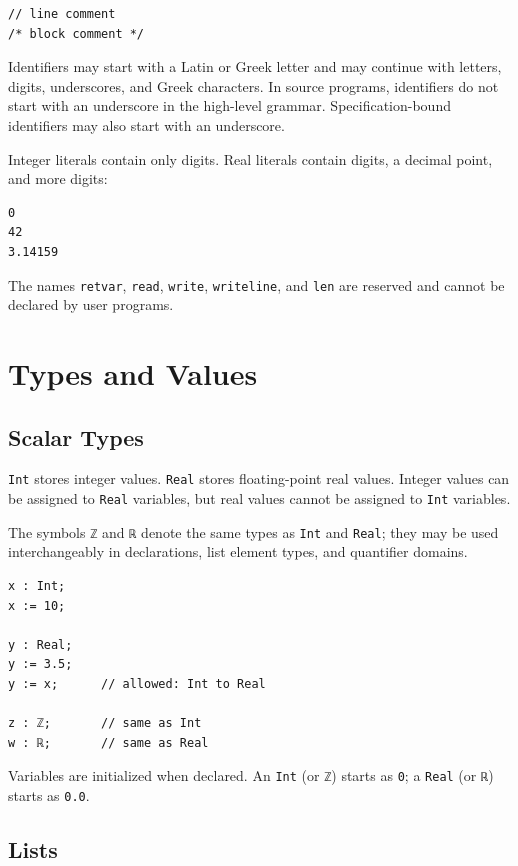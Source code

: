 \documentclass[11pt]{article}
\begin{document}
\begin{lstlisting}
// line comment
/* block comment */
\end{lstlisting}

Identifiers may start with a Latin or Greek letter and may continue with letters, digits, underscores, and Greek characters. In source programs, identifiers do not start with an underscore in the high-level grammar. Specification-bound identifiers may also start with an underscore.

Integer literals contain only digits. Real literals contain digits, a decimal point, and more digits:

\begin{lstlisting}
0
42
3.14159
\end{lstlisting}

The names \texttt{retvar}, \texttt{read}, \texttt{write}, \texttt{writeline}, and \texttt{len} are reserved and cannot be declared by user programs.

\section{Types and Values}

\subsection{Scalar Types}

\texttt{Int} stores integer values. \texttt{Real} stores floating-point real values. Integer values can be assigned to \texttt{Real} variables, but real values cannot be assigned to \texttt{Int} variables.

The symbols \texttt{ℤ} and \texttt{ℝ} denote the same types as \texttt{Int} and \texttt{Real}; they may be used interchangeably in declarations, list element types, and quantifier domains.

\begin{lstlisting}
x : Int;
x := 10;

y : Real;
y := 3.5;
y := x;      // allowed: Int to Real

z : ℤ;       // same as Int
w : ℝ;       // same as Real
\end{lstlisting}

Variables are initialized when declared. An \texttt{Int} (or \texttt{ℤ}) starts as \texttt{0}; a \texttt{Real} (or \texttt{ℝ}) starts as \texttt{0.0}.

\subsection{Lists}
\end{document}
